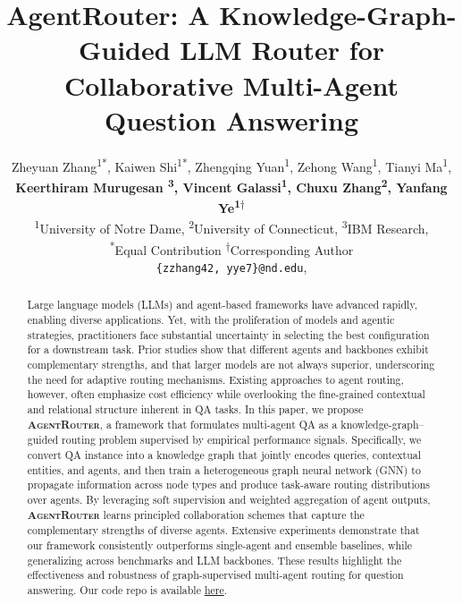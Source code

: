 \documentclass[11pt]{article}
\title{AgentRouter: A Knowledge-Graph-Guided LLM Router 
for \\ Collaborative Multi-Agent Question Answering}
\author{
\small
    Zheyuan Zhang\textsuperscript{1}\textsuperscript{*}, 
    Kaiwen Shi\textsuperscript{1}\textsuperscript{*}, 
    Zhengqing Yuan\textsuperscript{1},
    Zehong Wang\textsuperscript{1}, 
    Tianyi Ma\textsuperscript{1}, \\
\small
    \textbf{Keerthiram Murugesan \textsuperscript{3},
    Vincent Galassi\textsuperscript{1},
    Chuxu Zhang\textsuperscript{2},
    Yanfang Ye\textsuperscript{1}\textsuperscript{$\dagger$}} \\
\small
    \textsuperscript{1}University of Notre Dame, 
    \textsuperscript{2}University of Connecticut,
    \textsuperscript{3}IBM Research, \\
\small
    \textsuperscript{*}Equal Contribution 
    \textsuperscript{$\dagger$}Corresponding Author
    \\
\small
    \texttt{\{zzhang42, yye7\}@nd.edu},
}
\begin{document}
\maketitle
\begin{abstract}

Large language models (LLMs) and agent-based frameworks have advanced rapidly, enabling diverse applications. Yet, with the proliferation of models and agentic strategies, practitioners face substantial uncertainty in selecting the best configuration for a downstream task. Prior studies show that different agents and backbones exhibit complementary strengths, and that larger models are not always superior, underscoring the need for adaptive routing mechanisms. Existing approaches to agent routing, however, often emphasize cost efficiency while overlooking the fine-grained contextual and relational structure inherent in QA tasks. In this paper, we propose \textbf{\textsc{AgentRouter}}, a framework that formulates multi-agent QA as a knowledge-graph–guided routing problem supervised by empirical performance signals. Specifically, we convert QA instance into a knowledge graph that jointly encodes queries, contextual entities, and agents, and then train a heterogeneous graph neural network (GNN) to propagate information across node types and produce task-aware routing distributions over agents. By leveraging soft supervision and weighted aggregation of agent outputs, \textbf{\textsc{AgentRouter}} learns principled collaboration schemes that capture the complementary strengths of diverse agents. Extensive experiments demonstrate that our framework consistently outperforms single-agent and ensemble baselines, while generalizing across benchmarks and LLM backbones. These results highlight the effectiveness and robustness of graph-supervised multi-agent routing for question answering. Our code repo is available \href{https://anonymous.4open.science/r/AgentRouter}{here}. 

\end{abstract}

\end{document}
